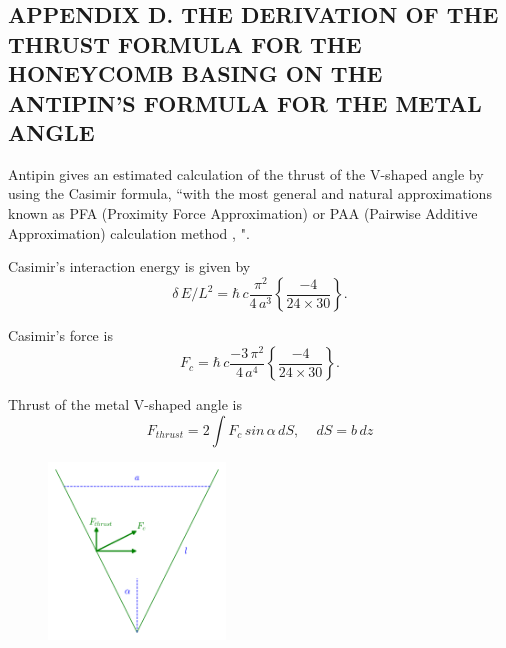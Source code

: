 \documentclass[twoside, 10pt, ptm]{article}
\begin{document}
\begin{multicols}{2}

    \section*{\centering\uppercase{Appendix D. The derivation of the thrust formula for the
honeycomb basing on the Antipin's formula for the metal
angle}}\label{appendix-d.-the-derivation-of-the-thrust-formula-for-the-honeycomb-basing-on-the-antipin-formula-for-the-thrust-of-a-metal-angle}
\vspace{-3.5mm}

\setcounter{equation}{0}
\renewcommand{\theequation}{D.\arabic{equation}}

    Antipin \cite{Antipin2012} gives an estimated calculation of the thrust
of the V-shaped angle by using the Casimir formula, ``with the most
general and natural approximations known as PFA (Proximity Force
Approximation) or PAA (Pairwise Additive Approximation) calculation
method \cite{Intravaia2013}, \cite{Rodriguez2011}".

Casimir's interaction energy is given by
\noindent
\begin{equation}\delta\,E/L^2 = \hbar\,c\frac{\pi^2}{4\,a^3}\left\{\frac{-4}{24\times30}\right\}.\end{equation}

Casimir's force is
\noindent
\begin{equation}F_{c} = \hbar\,c\frac{-3\,\pi^2}{4\,a^4}\left\{\frac{-4}{24\times30}\right\}.\end{equation}

Thrust of the metal V-shaped angle is
\noindent
\begin{equation}F_{thrust} = 2 \int F_{c} \, sin\, \alpha \,dS, \,\,\,\,\,\,\, dS = b\,dz\end{equation}

\begin{figure}
\begin{center}
\includegraphics[width=0.42\textwidth]{Antipins_angle_en.png}
\caption{}{}
\end{center}
\label{fig:Antipins_angle}
\end{figure}


\end{multicols}
\end{document}
